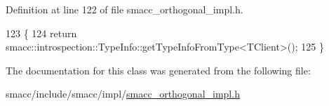 Definition at line 122 of file smacc\+\_\+orthogonal\+\_\+impl.\+h.


\begin{DoxyCode}
123     \{
124         \textcolor{keywordflow}{return} smacc::introspection::TypeInfo::getTypeInfoFromType<TClient>();
125     \}
\end{DoxyCode}


The documentation for this class was generated from the following file\+:\begin{DoxyCompactItemize}
\item 
smacc/include/smacc/impl/\hyperlink{smacc__orthogonal__impl_8h}{smacc\+\_\+orthogonal\+\_\+impl.\+h}\end{DoxyCompactItemize}
